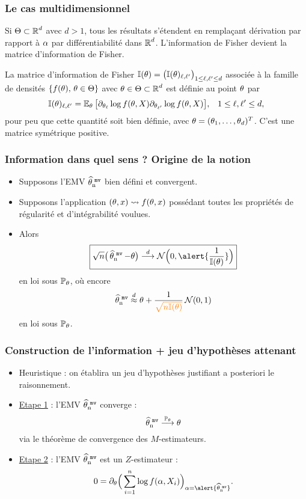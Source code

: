 \begin{frame}
\frametitle{Le cas multidimensionnel} 
Si $\Theta \subset \operatorname{{\mathbb R}}^d$ avec $ d >1$, tous les résultats s'étendent en remplaçant dérivation par rapport à $\alpha$ par différentiabilité dans $\operatorname{{\mathbb R}}^d$. L'information de Fisher devient la \alert{matrice d'information de Fisher}.
\begin{definition} La matrice d'information de Fisher $\mathbb{I}(\theta) = \big(\mathbb{I}(\theta)_{\ell,\ell'}\big)_{1 \leq \ell,\ell' \leq d}$ associée à la famille de densités $\{f(\theta),\,\theta \in \Theta\}$ avec $\theta \in \Theta \subset \operatorname{{\mathbb R}}^d$ est définie au point $\theta$ par
$$\mathbb{I}(\theta)_{\ell,\ell'} = \operatorname{{\mathbb E}}_\theta\big[\partial_{\theta_\ell}\log f(\theta, X) \partial_{\theta_{\ell'}} \log f(\theta, X)\big],\;\;\;1 \leq \ell,\ell' \leq d,$$
pour peu que cette quantité soit bien définie, avec $\theta  = (\theta_1,\ldots, \theta_d)^T$. C'est une matrice symétrique positive.
\end{definition}
\end{frame}

\begin{frame}
\frametitle{Information dans quel sens ? Origine de la notion}
\begin{itemize}
\item Supposons l'EMV $\operatorname{\widehat \theta_n^{\,\,{\tt mv}}}$ bien défini et \alert{convergent}.
\item Supposons l'application $(\theta,x) \leadsto f(\theta, x)$ possédant \alert{toutes les propriétés de régularité et d'intégrabilité} voulues.
\item Alors
$$\boxed{\sqrt{n}\big(\estMV-\truetheta\big) \stackrel{d}{\longrightarrow} {\mathcal N}\Big(0,\alert{\frac{1}{\mathbb{I}(\truetheta)}}\Big)}$$
en loi sous $\operatorname{{\mathbb P}}_\theta$, où encore
$$\estMV \stackrel{d}{\approx} \truetheta +\frac{1}{\tco{\sqrt{n\mathbb{I}(\truetheta)}}} \,{\mathcal N}(0,1)$$
en loi sous $\operatorname{{\mathbb P}}_\theta$.
\end{itemize}
\end{frame}

\begin{frame}
\frametitle{Construction de l'information + jeu d'hypothèses attenant}
\begin{itemize}
\item Heuristique : on établira un jeu d'hypothèses justifiant \alert{a posteriori} le raisonnement.
\item \underline{Etape 1} : l'EMV $\operatorname{\widehat \theta_n^{\,\,{\tt mv}}}$ \alert{converge} :
$$\operatorname{\widehat \theta_n^{\,\,{\tt mv}}} \stackrel{\operatorname{{\mathbb P}}_\theta}{\longrightarrow} \theta$$
via le théorème de convergence des $M$-estimateurs.
\item \underline{Etape 2} : l'EMV $\operatorname{\widehat \theta_n^{\,\,{\tt mv}}}$ est un \alert{$Z$-estimateur} :
$$0 = \partial_\truetheta \Big(\sum_{i = 1}^n \log f(\curtheta,X_i)\Big)_{\curtheta = \alert{\estMV}}.$$
\end{itemize}
\end{frame}


